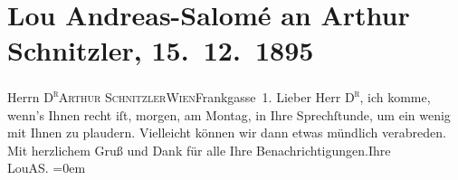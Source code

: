 

         \renewcommand{\erwaehnteOrte}{Orte: Frankgasse, I., Innere Stadt, IX., Alsergrund, Wien}
         \renewcommand{\erwaehnteWerke}{}
               \section[Lou Andreas-Salomé an Arthur Schnitzler, 15. 12. 1895]{ Lou Andreas-Salomé an Arthur Schnitzler, 15. 12. 1895}\nopagebreak{}\rehead{ }\begin{ledgroupsized}[t]{13cm}\normalsize\beginnumbering \toendnotes[C]{\smallbreak\pagebreak[2]} 
\pstart{}{\pb}Herrn \textsc{D\textsuperscript{r}}\pend{}\pstart{}\textsc{Arthur Schnitzler}\pend{}\pstart{}\textsc{Wien}\pend{}\pstart{}Frankgasse 1. \pend{}{\bigskip}\pstart
           \noindent{}{\pb}Lieber Herr \textsc{D\textsuperscript{r}}, ich komme, wenn's Ihnen recht iſt, morgen, am Montag, in Ihre Sprechſtunde, um ein wenig mit Ihnen zu
               plaudern. Vielleicht können wir dann etwas mündlich verabreden.\pend
           \pstart
           Mit herzlichem Gruß und Dank für alle Ihre Benachrichtigungen.\hspace*{1.5em}Ihre{\\[\baselineskip]}\spacefill\mbox{LouAS.}\pend
           \leftskip=0em{}
         
         \endnumbering{}\end{ledgroupsized}  \newcommand{\dateiname}{L00521}\newcommand{\titel}{Lou Andreas-Salomé an Arthur Schnitzler, 15. 12. 1895}\newcommand{\editorInnen}{Martin Anton Müller und Gerd-Hermann Susen}
      